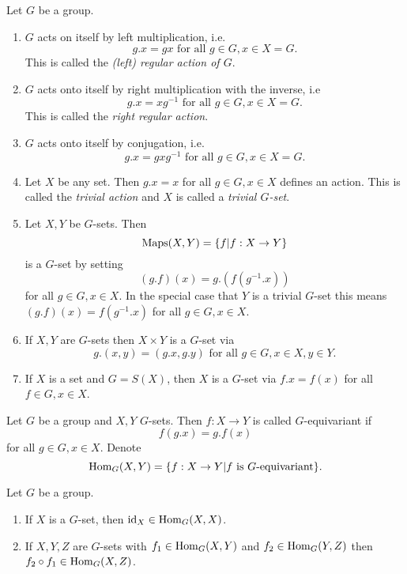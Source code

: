 \begin{expls}
 Let $G$ be a group.
 \begin{enumerate}
  \item
   $G$ acts on itself by left multiplication, i.e.
   \[
    g.x = gx \text{ for all } g \in G, x \in X=G.
   \]
   This is called the \emph{(left) regular action of $G$}.
  \item
   $G$ acts onto itself by right multiplication with the inverse, i.e
   \[
    g.x = xg^{-1} \text{ for all } g \in G, x \in X=G.
   \]
   This is called the \emph{right regular action}.
  \item
   $G$ acts onto itself by conjugation, i.e.
   \[
    g.x = gxg^{-1} \text{ for all }g \in G, x \in X=G.
   \]
  \item
   Let $X$ be any set. Then $g.x = x$ for all $g \in G, x \in X$ defines an action. This is called the \emph{trivial action} and $X$ is called a \emph{trivial $G$-set}.
  \item
   Let $X, Y$ be $G$-sets. Then
   \[
    \operatorname{Maps}(X,Y) = \{f | f : X \to Y\}
   \]
   is a $G$-set by setting
   \[
    (g.f)(x) = g.\left(f\left(g^{-1}.x\right)\right)
   \]
   for all $g \in G, x \in X$.
   In the special case that $Y$ is a trivial $G$-set this means $(g.f)(x) = f(g^{-1}.x)$ for all $g \in G, x \in X$.
  \item
   If $X, Y$ are $G$-sets then $X \times Y$ is a $G$-set via
   \[
    g.(x,y) = (g.x,g.y) \text{ for all } g \in G, x \in X, y \in Y.
   \]
  \item
   If $X$ is a set and $G = S(X)$, then $X$ is a $G$-set via $f.x = f(x)$ for all $f \in G, x \in X$.
 \end{enumerate}
\end{expls}


\begin{defi}
 Let $G$ be a group and $X, Y$ $G$-sets. Then $f : X \to Y$ is called $G$-equivariant if
 \[
  f(g.x) = g.f(x)
 \]
 for all $g \in G, x \in X$. Denote
 \[
  \operatorname{Hom}_G(X,Y) = \{f : X \to Y | f \text{ is $G$-equivariant}\}.
 \]
\end{defi}


\begin{lem}
 Let $G$ be a group.
 \begin{enumerate}
  \item If $X$ is a $G$-set, then $\operatorname{id}_X \in \operatorname{Hom}_G(X,X)$.
  \item If $X, Y, Z$ are $G$-sets with $f_1 \in \operatorname{Hom}_G(X,Y)$ and $f_2 \in \operatorname{Hom}_G(Y,Z)$ then $f_2 \circ f_1 \in \operatorname{Hom}_G(X,Z)$.
 \end{enumerate}
\end{lem}


